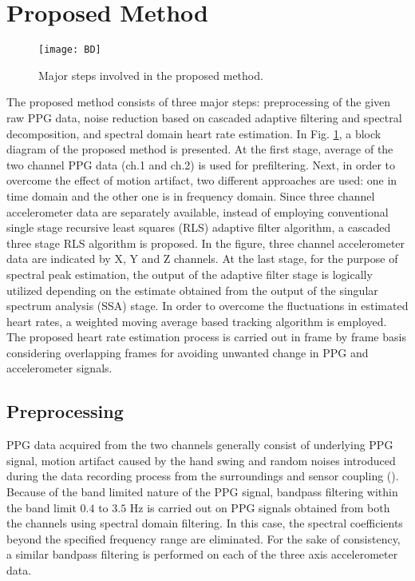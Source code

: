 \documentclass[final,3p,times,authoryear]{elsarticle}
\begin{document}
\section{Proposed Method}

\begin{figure}[h]
  \centering
  \texttt{[image: BD]}\\
  \caption{Major steps involved in the proposed method. }\label{Fig:block_diagram}
\end{figure}

The proposed method consists of three major steps: preprocessing of the given raw PPG data, noise reduction based on cascaded adaptive filtering and spectral decomposition, and spectral domain heart rate estimation. In Fig. \ref{Fig:block_diagram}, a block diagram of the proposed method is presented. At the first stage, average of the two channel PPG data (ch.1 and ch.2) is used for prefiltering. Next, in order to overcome the effect of motion artifact, two different approaches are used: one in time domain and the other one is in frequency domain. Since three channel accelerometer data are separately available, instead of employing conventional single stage recursive least squares (RLS) adaptive filter algorithm, a cascaded three stage RLS algorithm is proposed. In the figure, three channel accelerometer data are indicated by X, Y and Z channels. At the last stage, for the purpose of spectral peak estimation, the output of the adaptive filter stage is logically utilized depending on the estimate obtained from the output of the singular spectrum analysis (SSA) stage. In order to overcome the fluctuations in estimated heart rates, a weighted moving average based tracking algorithm is employed. The proposed heart rate estimation process is carried out in frame by frame basis considering overlapping frames for avoiding unwanted change in PPG and accelerometer signals. 



\subsection{Preprocessing}




PPG data acquired from the two channels generally consist of underlying PPG signal, motion artifact caused by the hand swing and random noises introduced during the data recording process from the surroundings and sensor coupling (\cite{bib:TROIKA}). Because of the band limited nature of the PPG signal, bandpass filtering within the band limit $0.4$ to $3.5$ Hz is carried out on PPG signals obtained from both the channels using spectral domain filtering. In this case, the spectral coefficients beyond the specified frequency range are eliminated. For the sake of consistency, a similar bandpass filtering is performed on each of the three axis accelerometer data. 
\end{document}
